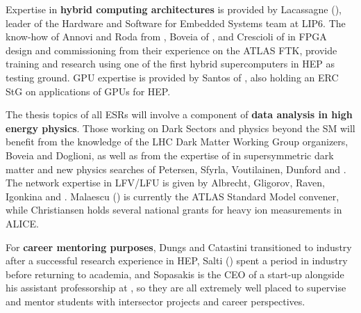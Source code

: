 Expertise in \textbf{hybrid computing architectures} is provided by Lacassagne (\sorbonneentity), leader of the Hardware and Software for Embedded Systems team at LIP6. 
The know-how of Annovi and Roda from \pisaentity, Boveia of \ohioentity, and Crescioli of \cnrsentity in FPGA design and commissioning from their experience on the ATLAS FTK, provide training and research using one of the first hybrid supercomputers in HEP as testing ground. 
GPU expertise is provided by Santos of \santiagoentity, also holding an ERC StG on applications of GPUs for HEP. 

The thesis topics of all ESRs will involve a component of \textbf{data analysis in high energy physics}. 
Those working on Dark Sectors and physics beyond the SM will benefit from the knowledge of the LHC Dark Matter Working Group organizers, 
Boveia and Doglioni, as well as from the expertise of in supersymmetric dark matter and new physics searches of Petersen, Sfyrla, 
Voutilainen, Dunford and . 
The network expertise in LFV/LFU is given by Albrecht, Gligorov, Raven, Igonkina and . 
Malaescu (\cnrsentity) is currently the ATLAS Standard Model convener, while Christiansen holds several national grants for heavy ion measurements in ALICE. 

For \textbf{career mentoring purposes}, Dungs and Catastini transitioned to industry after a successful research experience in HEP, Salti (\uniboentity) spent a period in industry before returning to academia, and Sopasakis is the CEO of a start-up alongside his assistant professorship at \lundentity, so they are all extremely well placed to supervise and mentor students with intersector projects and career perspectives. 


